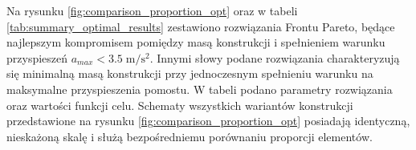 Na rysunku \ref{fig:comparison_proportion_opt} oraz w tabeli \ref{tab:summary_optimal_results} zestawiono rozwiązania Frontu Pareto, będące najlepszym kompromisem pomiędzy masą konstrukcji i spełnieniem warunku przyspieszeń $a_{max}<3.5\;\mathrm{m/s^2}$. Innymi słowy podane rozwiązania charakteryzują się minimalną masą konstrukcji przy jednoczesnym spełnieniu warunku na maksymalne przyspieszenia pomostu. W tabeli podano parametry rozwiązania oraz wartości funkcji celu. Schematy wszystkich wariantów konstrukcji przedstawione na rysunku \ref{fig:comparison_proportion_opt} posiadają identyczną, nieskażoną skalę i służą bezpośredniemu porównaniu proporcji elementów.






